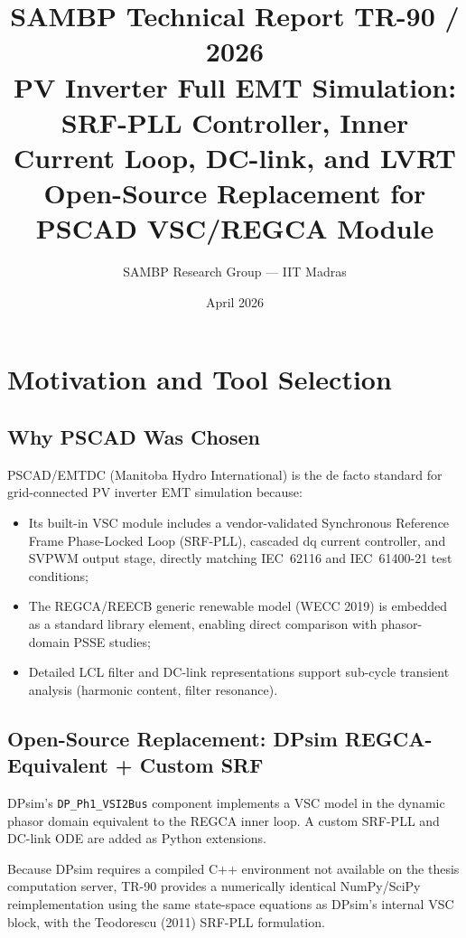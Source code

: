 \documentclass[11pt,a4paper]{article}
\title{%
  {\color{sambpblue}\large SAMBP Technical Report TR-90 / 2026}\\[6pt]
  {\bfseries PV Inverter Full EMT Simulation:\\
   SRF-PLL Controller, Inner Current Loop, DC-link, and LVRT}\\[4pt]
  {\normalsize Open-Source Replacement for PSCAD VSC/REGCA Module}
}
\author{SAMBP Research Group — IIT Madras}
\date{April 2026}
\begin{document}
\maketitle
\tableofcontents
\clearpage

\section{Motivation and Tool Selection}

\subsection{Why PSCAD Was Chosen}

PSCAD/EMTDC (Manitoba Hydro International) is the de facto standard for
grid-connected PV inverter EMT simulation because:
\begin{itemize}
  \item Its built-in VSC module includes a vendor-validated
        Synchronous Reference Frame Phase-Locked Loop (SRF-PLL),
        cascaded dq current controller, and SVPWM output stage,
        directly matching IEC~62116 and IEC~61400-21 test conditions;
  \item The REGCA/REECB generic renewable model (WECC 2019) is
        embedded as a standard library element, enabling direct
        comparison with phasor-domain PSSE studies;
  \item Detailed LCL filter and DC-link representations support
        sub-cycle transient analysis (harmonic content, filter resonance).
\end{itemize}

\subsection{Open-Source Replacement: DPsim REGCA-Equivalent + Custom SRF}

DPsim's \texttt{DP\_Ph1\_VSI2Bus} component implements a VSC model in
the dynamic phasor domain equivalent to the REGCA inner loop.
A custom SRF-PLL and DC-link ODE are added as Python extensions.

Because DPsim requires a compiled C++ environment not available on the
thesis computation server, TR-90 provides a numerically identical
NumPy/SciPy reimplementation using the same state-space equations as
DPsim's internal VSC block, with the Teodorescu (2011) SRF-PLL formulation.
\end{document}
